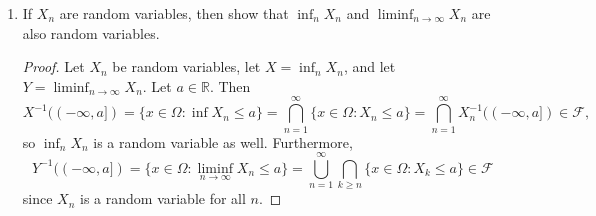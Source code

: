 \documentclass[11pt,oneside,english]{amsart}
\theoremstyle{definition}
\newcommand{\MC}[1]{\mathcal{#1}}
\newcommand{\MB}[1]{\mathbb{#1}}
\newcommand{\1}{\mathbbm{1}}
\begin{document}
\begin{enumerate}[leftmargin=*]
\begin{enumerate}
\item If $X_n$ are random variables, then show that $\inf_n X_n$ and $\liminf_{n\to\infty} X_n$ are also random variables.

\begin{proof}
Let $X_n$ be random variables, let $X=\inf_n X_n$, and let $Y=\liminf_{n\to\infty}X_n$. Let $a\in\MB{R}$. Then 
\[
X^{-1}((-\infty,a])=\{x\in\Omega:\inf X_n\leq a\}=\bigcap_{n=1}^\infty \{x\in \Omega: X_n\leq a\}=\bigcap_{n=1}^\infty X_n^{-1}((-\infty,a])\in\MC{F},
\]
so $\inf_n X_n$ is a random variable as well. Furthermore, 
\[
Y^{-1}((-\infty,a])=\{x\in \Omega:\liminf_{n\to\infty} X_n\leq a\}=\bigcup_{n=1}^\infty\bigcap_{k\geq n}\{x\in\Omega:X_k\leq a\}\in\MC{F}
\]
since $X_n$ is a random variable for all $n$.
\end{proof}

\end{enumerate}



\end{enumerate}
\end{document}
